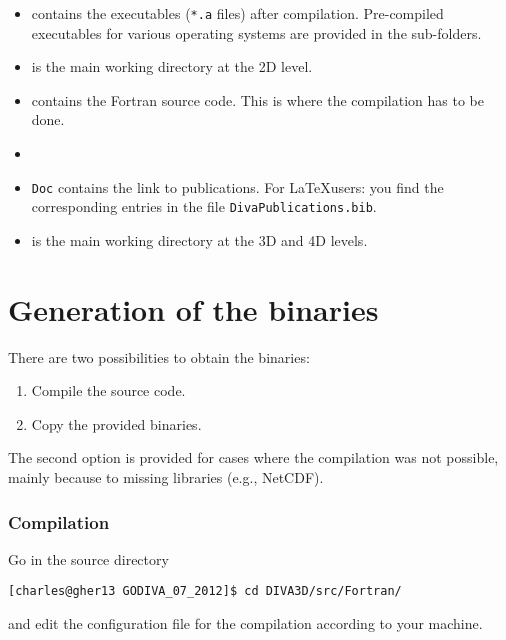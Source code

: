 \begin{itemize}
\item {} contains the executables (\texttt{*.a} files) after compilation. Pre-compiled executables for various operating systems are provided in the sub-folders.
\item {} is the main working directory at the 2D level. 
\item {} contains the Fortran source code. This is where the compilation has to be done.
\item[]
\item \texttt{Doc} contains the link to publications. For \LaTeX users: you find the corresponding \BibTeX entries in the file \texttt{DivaPublications.bib}.
\item {} is the main working directory at the 3D and 4D levels.
\end{itemize}

\section{Generation of the binaries }

There are two possibilities to obtain the binaries: 
\begin{enumerate}
\item Compile the source code.
\item Copy the provided binaries.
\end{enumerate}
The second option is provided for cases where the compilation was not possible, mainly because to missing libraries (e.g., NetCDF). 

\subsubsection{Compilation\label{sec:compilation}}

Go in the source directory 
\begin{lstlisting}[style=Bash]
[charles@gher13 GODIVA_07_2012]$ cd DIVA3D/src/Fortran/
\end{lstlisting}
and edit the configuration file  for the compilation  according to your machine. 

%
%
%
%
%
%
%

